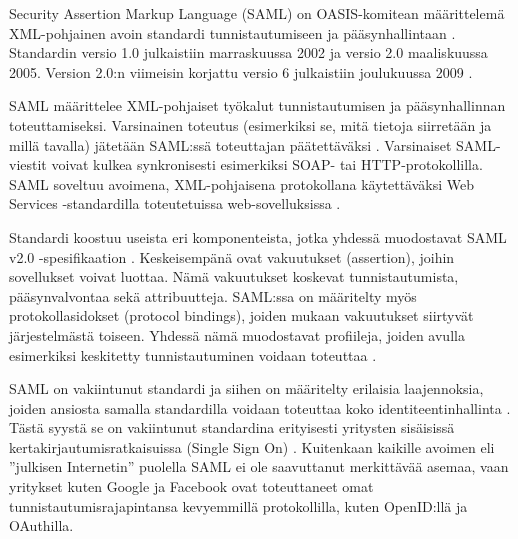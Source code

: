 Security Assertion Markup Language (SAML) on OASIS-komitean määrittelemä XML-pohjainen avoin standardi tunnistautumiseen ja pääsynhallintaan \cite{saml_spec}. Standardin versio 1.0 julkaistiin marraskuussa 2002 ja versio 2.0 maaliskuussa 2005. Version 2.0:n viimeisin korjattu versio 6 julkaistiin joulukuussa 2009 \cite{saml_spec}.

SAML määrittelee XML-pohjaiset työkalut tunnistautumisen ja pääsynhallinnan toteuttamiseksi. Varsinainen toteutus (esimerkiksi se, mitä tietoja siirretään ja millä tavalla) jätetään SAML:ssä toteuttajan päätettäväksi \cite{dynamic_saml}. Varsinaiset SAML-viestit voivat kulkea synkronisesti esimerkiksi SOAP- tai HTTP-protokollilla. SAML soveltuu avoimena, XML-pohjaisena protokollana käytettäväksi Web Services -stan\-dar\-dil\-la toteutetuissa web-sovelluksissa \cite{dynamic_saml}.

Standardi koostuu useista eri komponenteista, jotka yhdessä muodostavat SAML v2.0 -spesifikaation \cite{saml_spec}. Keskeisempänä ovat vakuutukset (assertion), joihin sovellukset voivat luottaa. Nämä vakuutukset koskevat tunnistautumista, pääsynvalvontaa sekä attribuutteja. SAML:ssa on määritelty myös protokollasidokset (protocol bindings), joiden mukaan vakuutukset siirtyvät järjestelmästä toiseen. Yhdessä nämä muodostavat profiileja, joiden avulla esimerkiksi keskitetty tunnistautuminen voidaan toteuttaa \cite{saml_spec}.

SAML on vakiintunut standardi ja siihen on määritelty erilaisia laajennoksia, joiden ansiosta samalla standardilla voidaan toteuttaa koko identiteentinhallinta \cite{saml_spec}. Tästä syystä se on vakiintunut standardina erityisesti yritysten sisäisissä kertakirjautumisratkaisuissa (Single Sign On) \cite{dynamic_saml}. Kuitenkaan kaikille avoimen eli ''julkisen Internetin'' puolella SAML ei ole saavuttanut merkittävää asemaa, vaan yritykset kuten Google ja Facebook ovat toteuttaneet omat tunnistautumisrajapintansa kevyemmillä protokollilla, kuten OpenID:llä ja OAuthilla.